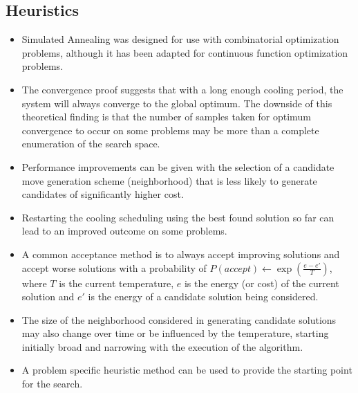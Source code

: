 \subsection{Heuristics}
\begin{itemize}
	\item Simulated Annealing was designed for use with combinatorial optimization problems, although it has been adapted for continuous function optimization problems.
	\item The convergence proof suggests that with a long enough cooling period, the system will always converge to the global optimum. The downside of this theoretical finding is that the number of samples taken for optimum convergence to occur on some problems may be more than a complete enumeration of the search space. 
	\item Performance improvements can be given with the selection of a candidate move generation scheme (neighborhood) that is less likely to generate candidates of significantly higher cost.
	\item Restarting the cooling scheduling using the best found solution so far can lead to an improved outcome on some problems.
	\item A common acceptance method is to always accept improving solutions and accept worse solutions with a probability of $P(accept) \leftarrow \exp(\frac{e-e\prime}{T})$, where $T$ is the current temperature, $e$ is the energy (or cost) of the current solution and $e\prime$ is the energy of a candidate solution being considered.
	\item The size of the neighborhood considered in generating candidate solutions may also change over time or be influenced by the temperature, starting initially broad and narrowing with the execution of the algorithm.
	\item A problem specific heuristic method can be used to provide the starting point for the search.
\end{itemize}

